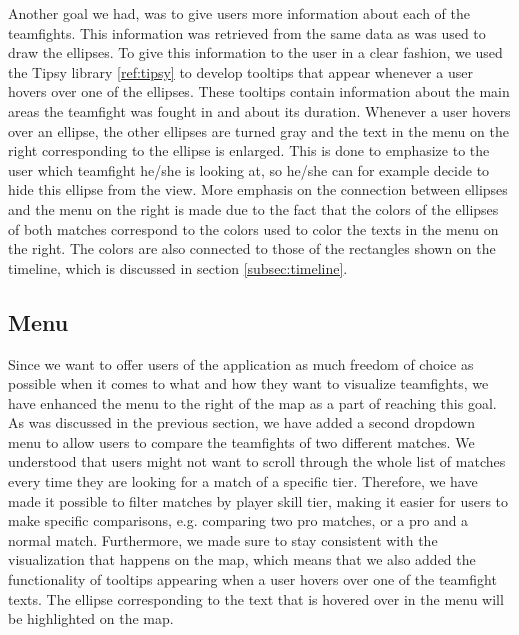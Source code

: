 \documentclass[11pt,twoside,a4paper]{article}
\begin{document}
Another goal we had, was to give users more information about each of the teamfights. This information was retrieved from the same data as was used to draw the ellipses. To give this information to the user in a clear fashion, we used the Tipsy library \ref{ref:tipsy}
to develop tooltips that appear whenever a user hovers over one of the ellipses. These tooltips contain information about the main areas the teamfight was fought in and about its duration. Whenever a user hovers over an ellipse, the other ellipses are turned gray and the text in the menu on the right corresponding to the ellipse is enlarged. This is done to emphasize to the user which teamfight he/she is looking at, so he/she can for example decide to hide this ellipse from the view.\newline\newline
More emphasis on the connection between ellipses and the menu on the right is made due to the fact that the colors of the ellipses of both matches correspond to the colors used to color the texts in the menu on the right. The colors are also connected to those of the rectangles shown on the timeline, which is discussed in section \ref{subsec:timeline}.
\newpage
\subsection{Menu}
\label{subsec:menu}
Since we want to offer users of the application as much freedom of choice as possible when it comes to what and how they want to visualize teamfights, we have enhanced the menu to the right of the map as a part of reaching this goal. As was discussed in the previous section, we have added a second dropdown menu to allow users to compare the teamfights of two different matches. We understood that users might not want to scroll through the whole list of matches every time they are looking for a match of a specific tier. Therefore, we have made it possible to filter matches by player skill tier, making it easier for users to make specific comparisons, e.g. comparing two pro matches, or a pro and a normal match.
\newline\newline
Furthermore, we made sure to stay consistent with the visualization that happens on the map, which means that we also added the functionality of tooltips appearing when a user hovers over one of the teamfight texts. The ellipse corresponding to the text that is hovered over in the menu will be highlighted on the map.
\end{document}
